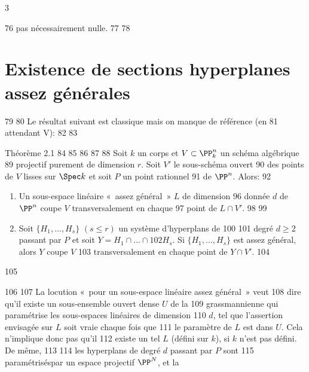 3	\documentclass[10pt]{../fichiers-configuration-latex/smfart}
\begin{document}
    76	pas nécessairement nulle.
    77	
    78	\section{Existence de sections hyperplanes assez générales}
    79	
    80	Le résultat suivant est classique mais on manque de référence (en
    81	attendant \EGA V):
    82	
    83	\begin{enonce*}{Théorème 2.1} %
    84	                                %
    85	                                %
    86	                                %
    87	                                %
    88	Soit $k$ un corps et $V\subset \PP^n_k$ un schéma algébrique
    89	projectif purement de dimension $r$. Soit $V'$ le sous-schéma ouvert
    90	des points de $V$ lisses sur $\Spec k$ et soit $P$ un point rationnel
    91	de $\PP^n$. Alors:
    92	\begin{enumerate}
    93	\renewcommand{\theenumi}{\roman{enumi}}
    94	\renewcommand{\labelenumi}{(\theenumi)}
    95	\item Un sous-espace linéaire « assez général » $L$ de dimension
    96	  donnée $d$ de $\PP^n$ coupe $V$ transversalement en chaque
    97	  point de $L\cap V'$.
    98	
    99	\item Soit $\{H_1,\ldots,H_s\}$ $(s\leq r)$ un système d'hyperplans de %
   100	                                %
   101	  degré $d\geq 2$ passant par $P$ et soit $Y=H_1\cap\ldots \cap
   102	  H_s$. Si $\{H_1,\ldots,H_s\}$ est assez général, alors $Y$ coupe $V$
   103	  transversalement en chaque point de $Y\cap V'$.
   104	\end{enumerate}
   105	\end{enonce*}
   106	
   107	La locution « pour un sous-espace linéaire assez général » veut
   108	dire qu'il existe un sous-ensemble ouvert dense $U$ de la
   109	grassmannienne qui paramétrise les sous-espaces linéaires de dimension %
   110	$d$, tel que l'assertion envisagée sur $L$ soit vraie chaque fois que
   111	le paramètre de $L$ est dans $U$. Cela n'implique donc pas qu'il
   112	existe un tel $L$ (défini sur $k$), si $k$ n'est pas défini. De même,
   113	%
   114	les hyperplans de degré $d$ passant par $P$ sont 
   115	paramétrisés\pageoriginale par un espace projectif $\PP^N$, et la %
\end{document}
